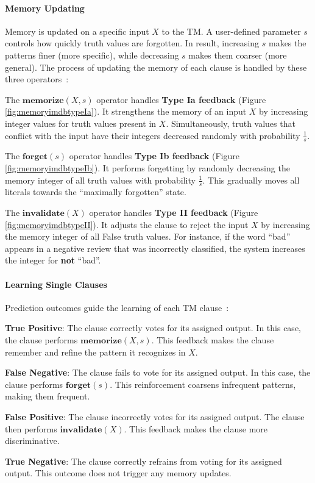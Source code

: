 \documentclass[english]{aghengthesis} %
\begin{document}
\paragraph{Memory Updating}
Memory is updated on a specific input $X$ to the TM. A user-defined parameter $s$ controls how quickly truth values are forgotten. In result, increasing $s$ makes the patterns finer (more specific), while decreasing $s$ makes them coarser (more general). The process of updating the memory of each clause is handled by these three operators~\cite{glimsdal2021coalescedmultioutputtsetlinmachines}:
\begin{compactitem}
    \item The $\textbf{memorize}(X,s)$ operator handles \textbf{Type Ia feedback} (Figure \ref{fig:memoryimdbtypeIa}). It strengthens the memory of an input $X$ by increasing integer values for truth values present in $X$. Simultaneously, truth values that conflict with the input have their integers decreased randomly with probability $\frac{1}{s}$.
    \item The $\textbf{forget}(s)$ operator handles \textbf{Type Ib feedback} (Figure \ref{fig:memoryimdbtypeIb}). It performs forgetting by randomly decreasing the memory integer of all truth values with probability $\frac{1}{s}$. This gradually moves all literals towards the ``maximally forgotten'' state.
    \item The $\textbf{invalidate}(X)$ operator handles \textbf{Type II feedback} (Figure \ref{fig:memoryimdbtypeII}). It adjusts the clause to reject the input $X$ by increasing the memory integer of all False truth values. For instance, if the word ``bad'' appears in a negative review that was incorrectly classified, the system increases the integer for \textbf{not} ``bad''.
\end{compactitem}

\paragraph{Learning Single Clauses}
Prediction outcomes guide the learning of each TM clause~\cite{glimsdal2021coalescedmultioutputtsetlinmachines}:
\begin{compactitem}
    \item \textbf{True Positive}: The clause correctly votes for its assigned output. In this case, the clause performs $\textbf{memorize}(X,s)$. This feedback makes the clause remember and refine the pattern it recognizes in $X$.
    \item \textbf{False Negative}: The clause fails to vote for its assigned output. In this case, the clause performs $\textbf{forget}(s)$. This reinforcement coarsens infrequent patterns, making them frequent.
    \item \textbf{False Positive}: The clause incorrectly votes for its assigned output. The clause then performs $\textbf{invalidate}(X)$. This feedback makes the clause more discriminative.
    \item \textbf{True Negative}: The clause correctly refrains from voting for its assigned output. This outcome does not trigger any memory updates.
\end{compactitem}
\end{document}
